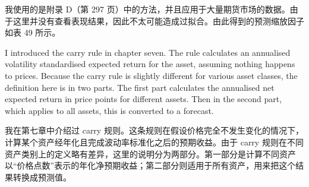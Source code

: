 \begin{chineseblock}我使用的是附录 D（第 297 页）中的方法，并且应用于大量期货市场的数据。由于这里并没有查看表现结果，因此不太可能造成过拟合。由此得到的预测缩放因子如表 49 所示。\end{chineseblock}

\begin{bilingualtableblock} 
\end{bilingualtableblock}


\begin{englishblock} I introduced the carry rule in chapter seven. The rule calculates an annualised volatility standardised expected return for the asset, assuming nothing happens to prices. Because the carry rule is slightly different for various asset classes, the definition here is in two parts. The first part calculates the annualised net expected return in price points for different assets. Then in the second part, which applies to all assets, this is converted to a forecast. \end{englishblock}

\begin{chineseblock}我在第七章中介绍过 carry 规则。这条规则在假设价格完全不发生变化的情况下，计算某个资产经年化且完成波动率标准化之后的预期收益。由于 carry 规则在不同资产类别上的定义略有差异，这里的说明分为两部分。第一部分是计算不同资产以“价格点数”表示的年化净预期收益；第二部分则适用于所有资产，用来把这个结果转换成预测值。\end{chineseblock}

